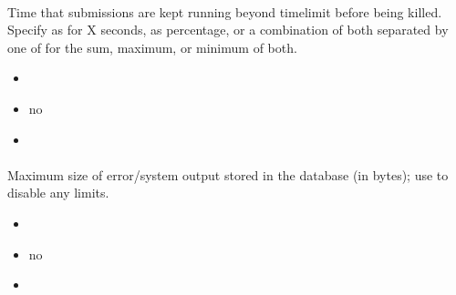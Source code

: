 \documentclass[a4paper,10pt,english,openany]{sphinxmanual}
\begin{document}
\paragraph{}
\label{\detokenize{configuration-reference:timelimit-overshoot}}
\sphinxAtStartPar
Time that submissions are kept running beyond timelimit before being killed. Specify as  for X seconds,  as percentage, or a combination of both separated by one of \sphinxtitleref{+|\&} for the sum, maximum, or minimum of both.
\begin{itemize}
\item {} 
\sphinxAtStartPar
{} 

\item {} 
\sphinxAtStartPar
{} no

\item {} 
\sphinxAtStartPar
{} 

\end{itemize}


\paragraph{}
\label{\detokenize{configuration-reference:output-storage-limit}}
\sphinxAtStartPar
Maximum size of error/system output stored in the database (in bytes); use  to disable any limits.
\begin{itemize}
\item {} 
\sphinxAtStartPar
{} 

\item {} 
\sphinxAtStartPar
{} no

\item {} 
\sphinxAtStartPar
{} 

\end{itemize}
\end{document}
